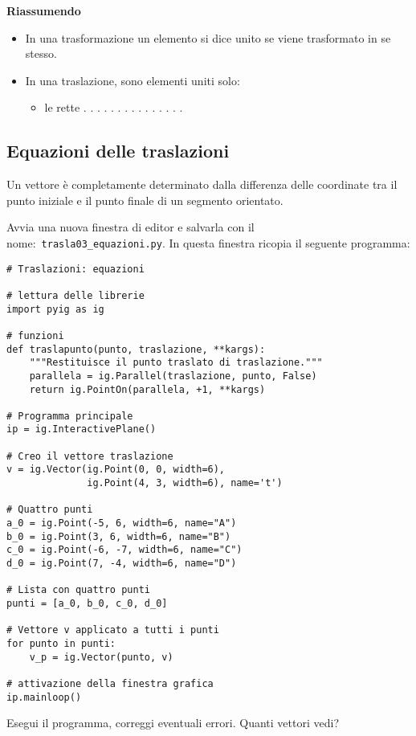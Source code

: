 \textbf{Riassumendo}
\begin{itemize} [noitemsep]
\item In una trasformazione un elemento si dice unito se viene trasformato in se
stesso.
\item In una traslazione, sono elementi uniti  solo:
\begin{itemize}
\item le rette . . . . . . . . . . . . . . .
\end{itemize}
\end{itemize}


\subsection{Equazioni delle traslazioni}

Un vettore è completamente determinato dalla differenza delle coordinate
tra il punto iniziale e il punto finale di un segmento orientato.

Avvia una nuova finestra di editor e salvarla con il
nome:~\lstinline{trasla03_equazioni.py}.
In questa finestra ricopia il seguente programma:

\begin{lstlisting}
# Traslazioni: equazioni

# lettura delle librerie
import pyig as ig

# funzioni
def traslapunto(punto, traslazione, **kargs):
    """Restituisce il punto traslato di traslazione."""
    parallela = ig.Parallel(traslazione, punto, False)
    return ig.PointOn(parallela, +1, **kargs)

# Programma principale
ip = ig.InteractivePlane()

# Creo il vettore traslazione
v = ig.Vector(ig.Point(0, 0, width=6),
              ig.Point(4, 3, width=6), name='t')

# Quattro punti
a_0 = ig.Point(-5, 6, width=6, name="A")
b_0 = ig.Point(3, 6, width=6, name="B")
c_0 = ig.Point(-6, -7, width=6, name="C")
d_0 = ig.Point(7, -4, width=6, name="D")

# Lista con quattro punti
punti = [a_0, b_0, c_0, d_0]

# Vettore v applicato a tutti i punti
for punto in punti:
    v_p = ig.Vector(punto, v)

# attivazione della finestra grafica
ip.mainloop()
\end{lstlisting}

Esegui il programma, correggi eventuali errori. Quanti vettori vedi?

